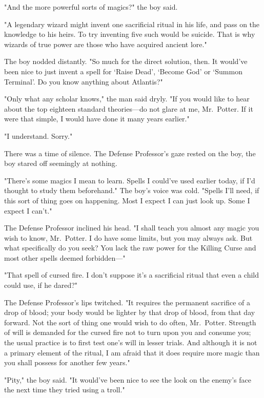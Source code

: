 "And the more powerful sorts of magics?" the boy said.

"A legendary wizard might invent one sacrificial ritual in his life, and pass
on the knowledge to his heirs. To try inventing five such would be suicide.
That is why wizards of true power are those who have acquired ancient lore."

The boy nodded distantly. "So much for the direct solution, then. It would've
been nice to just invent a spell for `Raise Dead', `Become God' or `Summon
Terminal'. Do you know anything about Atlantis?"

"Only what any scholar knows," the man said dryly. "If you would like to hear
about the top eighteen standard theories---do not glare at me, Mr.~Potter. If
it were that simple, I would have done it many years earlier."

"I understand. Sorry."

There was a time of silence. The Defense Professor's gaze rested on the boy,
the boy stared off seemingly at nothing.

"There's some magics I mean to learn. Spells I could've used earlier today, if
I'd thought to study them beforehand." The boy's voice was cold. "Spells I'll
need, if this sort of thing goes on happening. Most I expect I can just look
up. Some I expect I can't."

The Defense Professor inclined his head. "I shall teach you almost any magic
you wish to know, Mr.~Potter. I do have some limits, but you may always ask.
But what specifically do you seek? You lack the raw power for the Killing Curse
and most other spells deemed forbidden---"

"That spell of cursed fire. I don't suppose it's a sacrificial ritual that even
a child could use, if he dared?"

The Defense Professor's lips twitched. "It requires the permanent sacrifice of
a drop of blood; your body would be lighter by that drop of blood, from that
day forward. Not the sort of thing one would wish to do often, Mr.~Potter.
Strength of will is demanded for the cursed fire not to turn upon you and
consume you; the usual practice is to first test one's will in lesser trials.
And although it is not a primary element of the ritual, I am afraid that it
does require more magic than you shall possess for another few years."

"Pity," the boy said. "It would've been nice to see the look on the enemy's
face the next time they tried using a troll."

